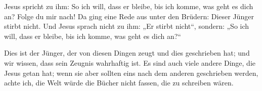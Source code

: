  Jesus spricht zu ihm: So ich will, dass er bleibe, bis
ich komme, was geht es dich an? Folge du mir nach!  Da
ging eine Rede aus unter den Brüdern: Dieser Jünger stirbt nicht. Und
Jesus sprach nicht zu ihm: „Er stirbt nicht``, sondern: „So ich will,
dass er bleibe, bis ich komme, was geht es dich an?{}``

 Dies ist der Jünger, der von diesen Dingen zeugt und
dies geschrieben hat; und wir wissen, dass sein Zeugnis wahrhaftig ist.
 Es sind auch viele andere Dinge, die Jesus getan hat;
wenn sie aber sollten eins nach dem anderen geschrieben werden, achte
ich, die Welt würde die Bücher nicht fassen, die zu schreiben wären.
